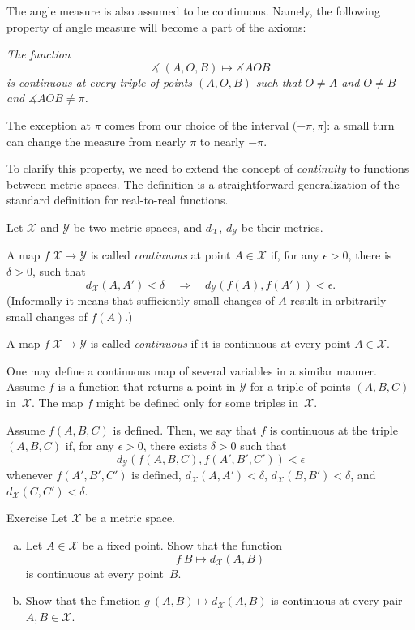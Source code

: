 The angle measure is also assumed to be continuous.
Namely, the following property of angle measure will become a part of the axioms:

\textit{The function}
$$\measuredangle\:(A,O,B)\mapsto\measuredangle A O B$$
\textit{is continuous at every triple of points $(A,O,B)$
such that $O\ne A$ and $O\ne B$ and $\measuredangle A O B\ne\pi$.}

The exception at $\pi$ comes from our choice of the interval $(-\pi,\pi]$: a small turn can change the measure from nearly $\pi$ to nearly $-\pi$.

To clarify this property, we need to extend the concept of {}\emph{continuity} to functions between metric spaces.
The definition is a straightforward generalization of the standard definition for real-to-real functions.

Let $\mathcal X$ and $\mathcal Y$ be two metric spaces,
and $d_{\mathcal X}$, $d_{\mathcal Y}$ be their metrics.

A map $f\:\mathcal X\to\mathcal Y$ is called \emph{continuous} at point $A\in \mathcal X$
if, for any $\epsilon>0$, there is $\delta>0$, such that 
\[d_{\mathcal X}(A,A')
<
\delta
\quad
\Rightarrow
\quad
d_{\mathcal Y}(f(A),f(A'))
<
\epsilon.\]
(Informally it means that sufficiently small changes of $A$ result in arbitrarily small changes of $f(A)$.)

A map $f\:\mathcal X\to\mathcal Y$ is called \emph{continuous} if it is continuous at every point $A\in \mathcal X$.

One may define a continuous map of several variables in a similar manner.
Assume $f$ is a function that returns a point in $\mathcal Y$ for a triple of points $(A,B,C)$
in~$\mathcal X$.
The map $f$ might be defined only for some triples in~$\mathcal X$.

Assume $f(A,B,C)$ is defined.
Then, we say that $f$ is continuous at the triple $(A,B,C)$ 
if, for any $\epsilon>0$, there exists $\delta>0$ such that
\[d_{\mathcal Y}(f(A,B,C),f(A',B',C'))<\epsilon\]
whenever $f(A',B',C')$ is defined, $d_{\mathcal X}(A,A')<\delta$, $d_{\mathcal X}(B,B')<\delta$, and $d_{\mathcal X}(C,C')<\delta$.


\begin{thm}[!]{Exercise}\label{ex:dist-cont}
Let $\mathcal{X}$ be a metric space.
\begin{enumerate}[(a)]
\item\label{ex:dist-cont:a} Let $A\in \mathcal{X}$ be a fixed point.
Show that the function 
$$f\:B\mapsto
d_{\mathcal{X}}(A,B)$$ 
is continuous at every point~$B$.
\item Show that the function $g\:(A,B)\mapsto d_{\mathcal{X}}(A,B)$ is continuous at every pair $A,B\in \mathcal{X}$.
\end{enumerate}

\end{thm}

